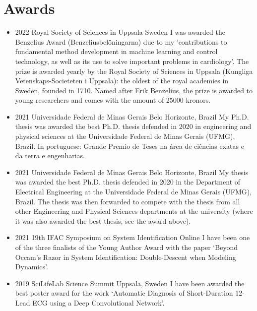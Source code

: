 \documentclass[10pt,A4]{article} %
\begin{document}
\section{Awards}

\begin{itemize}

    \item {}
    { 2022 }
    { Royal Society of Sciences in Uppsala }
    { Sweden }
    { I was awarded the Benzelius Award (Benzeliusbelöningarna) due to my 'contributions to fundamental method development in machine learning and control technology, as well as its use to solve important problems in cardiology'. The prize is awarded yearly by the Royal Society of Sciences in Uppsala (Kungliga Vetenskaps-Societeten i Uppsala): the oldest of the royal academies in Sweden, founded in 1710. Named after Erik Benzelius, the prize is awarded to young researchers and comes with the amount of 25000 kronors. }

    \item {}
    { 2021 }
    { Universidade Federal de Minas Gerais }
    { Belo Horizonte, Brazil }
    { My Ph.D. thesis was awarded the best Ph.D. thesis defended in 2020 in engineering and physical sciences at the Universidade Federal de Minas Gerais (UFMG), Brazil. In portuguese: Grande Premio de Teses na área de ciências exatas e da terra e engenharias. }

    \item {}
    { 2021 }
    { Universidade Federal de Minas Gerais }
    { Belo Horizonte, Brazil }
    { My thesis was awarded the best Ph.D. thesis defended in 2020 in the Department of Electrical Engineering at the Universidade Federal de Minas Gerais (UFMG), Brazil. The thesis was then forwarded to compete with the thesis from all other Engineering and Physical Sciences departments at the university (where it was also awarded the best thesis, see the award above). }

    \item {}
    { 2021 }
    { 19th IFAC Symposium on System Identification }
    { Online }
    { I have been one of the three finalists of the Young Author Award with the paper `Beyond Occam’s Razor in System Identification:  Double-Descent when Modeling Dynamics'. }

    \item {}
    { 2019 }
    { SciLifeLab Science Summit }
    { Uppsala, Sweden }
    { I have been awarded the best poster award for the work `Automatic Diagnosis of Short-Duration 12-Lead ECG using a Deep Convolutional Network'. }


\end{itemize}
\end{document}
